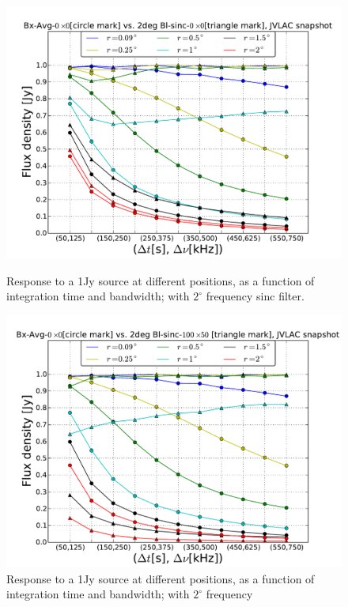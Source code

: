 \documentclass[useAMS,usenatbib]{mn2e}
\begin{document}
\begin{figure}
  \centering
\begin{minipage}{0.36\linewidth}\includegraphics[width=1\textwidth]{./Figures/max-integ-timefreq-sinc-w1x1-fov2.pdf}
    \caption{Response to a 1Jy source at different positions, as a function of integration time and bandwidth; with $2^{\circ}$ frequency 
sinc filter.}
    \label{fig:max-integ-timefreq-sinc-w1x1-fov2}\end{minipage}
 \hspace{1cm}
\begin{minipage}{0.36\linewidth}\includegraphics[width=1\textwidth]{./Figures/max-integ-timefreq-sinc-w100x50-fov2.pdf}
    \caption{Response to a 1Jy source at different positions, as a function of integration time and bandwidth; with $2^{\circ}$ frequency 
}
\end{minipage}
\end{figure}
\end{document}
